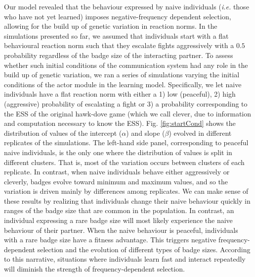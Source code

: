\documentclass[
  12pt,
]{article}
\begin{document}
Our model revealed that the behaviour expressed by naive individuals
(\emph{i.e.} those who have not yet learned) imposes negative-frequency
dependent selection, allowing for the build up of genetic variation in
reaction norms. In the simulations presented so far, we assumed that
individuals start with a flat behavioural reaction norm such that they
escalate fights aggressively with a \(0.5\) probability regardless of
the badge size of the interacting partner. To assess whether such
initial conditions of the communication system had any role in the build
up of genetic variation, we ran a series of simulations varying the
initial conditions of the actor module in the learning model.
Specifically, we let naive individuals have a flat reaction norm with
either a 1) low (peaceful), 2) high (aggressive) probability of
escalating a fight or 3) a probability corresponding to the ESS of the
original hawk-dove game (which we call clever, due to information and
computation necessary to know the ESS). Fig. \ref{fig:startCond} shows
the distribution of values of the intercept (\(\alpha\)) and slope
(\(\beta\)) evolved in different replicates of the simulations. The
left-hand side panel, corresponding to peaceful naive individuals, is
the only one where the distribution of values is split in different
clusters. That is, most of the variation occurs between clusters of each
replicate. In contrast, when naive individuals behave either
aggressively or cleverly, badges evolve toward minimum and maximum
values, and so the variation is driven mainly by differences among
replicates. We can make sense of these results by realizing that
individuals change their naive behaviour quickly in ranges of the badge
size that are common in the population. In contrast, an individual
expressing a rare badge size will most likely experience the naive
behaviour of their partner. When the naive behaviour is peaceful,
individuals with a rare badge size have a fitness advantage. This
triggers negative frequency-dependent selection and the evolution of
different types of badge sizes. According to this narrative, situations
where individuals learn fast and interact repeatedly will diminish the
strength of frequency-dependent selection.
\end{document}
